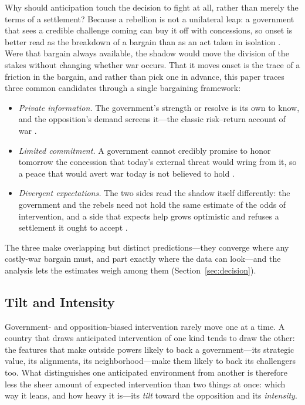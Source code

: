 Why should anticipation touch the decision to fight at all, rather than merely
the terms of a settlement?  Because a rebellion is not a unilateral leap: a
government that sees a credible challenge coming can buy it off with
concessions, so onset is better read as the breakdown of a bargain than as an
act taken in isolation \citep{walter2009}.  Were that bargain always available,
the shadow would move the division of the stakes without changing whether war
occurs.  That it moves onset is the trace of a friction in the bargain, and
rather than pick one in advance, this paper traces three common candidates
through a single bargaining framework:
\begin{itemize}
  \item \emph{Private information.}  The government's strength or resolve is
    its own to know, and the opposition's demand screens it---the classic
    risk--return account of war \citep{fearon1995}.
  \item \emph{Limited commitment.}  A government cannot credibly promise to
    honor tomorrow the concession that today's external threat would wring
    from it, so a peace that would avert war today is not believed to hold
    \citep{walter2009, powell2006}.
  \item \emph{Divergent expectations.}  The two sides read the shadow itself
    differently: the government and the rebels need not hold the same
    estimate of the odds of intervention, and a side that expects help grows
    optimistic and refuses a settlement it ought to accept
    \citep{cunningham2016, cetinyan2002}.
\end{itemize}
The three make overlapping but distinct predictions---they converge where any
costly-war bargain must, and part exactly where the data can look---and the
analysis lets the estimates weigh among them (Section~\ref{sec:decision}).

\subsection{Tilt and Intensity}

Government- and opposition-biased intervention rarely move one at a time.  A
country that draws anticipated intervention of one kind tends to draw the
other: the features that make
outside powers likely to back a government---its strategic value, its
alignments, its neighborhood---make them likely to back its challengers too.
What distinguishes one anticipated environment from another is therefore less
the sheer amount of expected intervention than two things at once: which way it
leans, and how heavy it is---its \emph{tilt} toward the opposition and its
\emph{intensity}.

